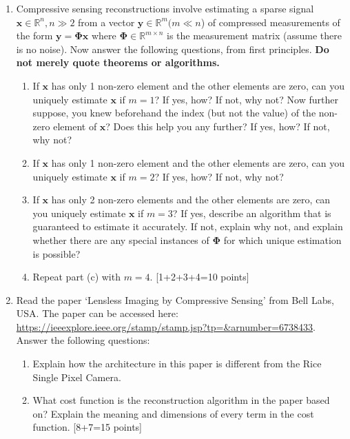 \documentclass[11pt]{article}
\begin{document}
\begin{enumerate}
\item Compressive sensing reconstructions involve estimating a sparse signal $\mathbf{x} \in \mathbb{R}^n, n \gg 2$ from a vector $\mathbf{y} \in \mathbb{R}^m (m \ll n$) of compressed measurements of the form $\mathbf{y} = \mathbf{\Phi x}$ where $\mathbf{\Phi} \in \mathbb{R}^{m \times n}$ is the measurement matrix (assume there is no noise). Now answer the following questions, from first principles. \textbf{Do not merely quote theorems or algorithms.}
\begin{enumerate}
\item If $\mathbf{x}$ has only 1 non-zero element and the other elements are zero, can you uniquely estimate $\mathbf{x}$ if $m = 1$? If yes, how? If not, why not? Now further suppose, you knew beforehand the index (but not the value) of the non-zero element of $\mathbf{x}$? Does this help you any further? If yes, how? If not, why not?
\item If $\mathbf{x}$ has only 1 non-zero element and the other elements are zero, can you uniquely estimate $\mathbf{x}$ if $m = 2$? If yes, how? If not, why not? 
\item If $\mathbf{x}$ has only 2 non-zero elements and the other elements are zero, can you uniquely estimate $\mathbf{x}$ if $m = 3$? If yes, describe an algorithm that is guaranteed to estimate it accurately. If not, explain why not, and explain whether there are any special instances of $\mathbf{\Phi}$ for which unique estimation is possible? 
\item Repeat part (c) with $m = 4$.  \textsf{[1+2+3+4=10 points]}
\end{enumerate} 

\item Read the paper `Lensless Imaging by Compressive Sensing' from Bell Labs, USA. The paper can be accessed here: \url{https://ieeexplore.ieee.org/stamp/stamp.jsp?tp=&arnumber=6738433}. Answer the following questions:
\begin{enumerate}
\item Explain how the architecture in this paper is different from the Rice Single Pixel Camera.
\item What cost function is the reconstruction algorithm in the paper based on? Explain the meaning and dimensions of every term in the cost function. \textsf{[8+7=15 points]}
\end{enumerate} 


\end{enumerate}
\end{document}
